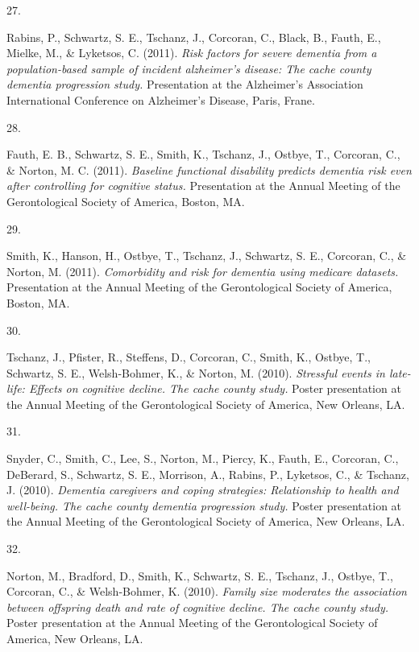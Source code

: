 \documentclass[11pt,a4paper,]{moderncv}
\newlength{\csllabelwidth}
\newcommand{\CSLLeftMargin}[1]{\parbox[t]{\csllabelwidth}{#1}}
\newcommand{\CSLRightInline}[1]{\parbox[t]{\linewidth - \csllabelwidth}{#1}}
\begin{document}
\leavevmode{}%
\CSLLeftMargin{27. }
\CSLRightInline{Rabins, P., Schwartz, S. E., Tschanz, J., Corcoran, C.,
Black, B., Fauth, E., Mielke, M., \& Lyketsos, C. (2011). \emph{Risk
factors for severe dementia from a population-based sample of incident
alzheimer's disease: The cache county dementia progression study.}
Presentation at the Alzheimer's Association International Conference on
Alzheimer's Disease, Paris, Frane.}

\leavevmode{}%
\CSLLeftMargin{28. }
\CSLRightInline{Fauth, E. B., Schwartz, S. E., Smith, K., Tschanz, J.,
Ostbye, T., Corcoran, C., \& Norton, M. C. (2011). \emph{Baseline
functional disability predicts dementia risk even after controlling for
cognitive status.} Presentation at the Annual Meeting of the
Gerontological Society of America, Boston, MA.}

\leavevmode{}%
\CSLLeftMargin{29. }
\CSLRightInline{Smith, K., Hanson, H., Ostbye, T., Tschanz, J.,
Schwartz, S. E., Corcoran, C., \& Norton, M. (2011). \emph{Comorbidity
and risk for dementia using medicare datasets.} Presentation at the
Annual Meeting of the Gerontological Society of America, Boston, MA.}

\leavevmode{}%
\CSLLeftMargin{30. }
\CSLRightInline{Tschanz, J., Pfister, R., Steffens, D., Corcoran, C.,
Smith, K., Ostbye, T., Schwartz, S. E., Welsh-Bohmer, K., \& Norton, M.
(2010). \emph{Stressful events in late-life: Effects on cognitive
decline. The cache county study.} Poster presentation at the Annual
Meeting of the Gerontological Society of America, New Orleans, LA.}

\leavevmode{}%
\CSLLeftMargin{31. }
\CSLRightInline{Snyder, C., Smith, C., Lee, S., Norton, M., Piercy, K.,
Fauth, E., Corcoran, C., DeBerard, S., Schwartz, S. E., Morrison, A.,
Rabins, P., Lyketsos, C., \& Tschanz, J. (2010). \emph{Dementia
caregivers and coping strategies: Relationship to health and well-being.
The cache county dementia progression study.} Poster presentation at the
Annual Meeting of the Gerontological Society of America, New Orleans,
LA.}

\leavevmode{}%
\CSLLeftMargin{32. }
\CSLRightInline{Norton, M., Bradford, D., Smith, K., Schwartz, S. E.,
Tschanz, J., Ostbye, T., Corcoran, C., \& Welsh-Bohmer, K. (2010).
\emph{Family size moderates the association between offspring death and
rate of cognitive decline. The cache county study.} Poster presentation
at the Annual Meeting of the Gerontological Society of America, New
Orleans, LA.}
\end{document}
